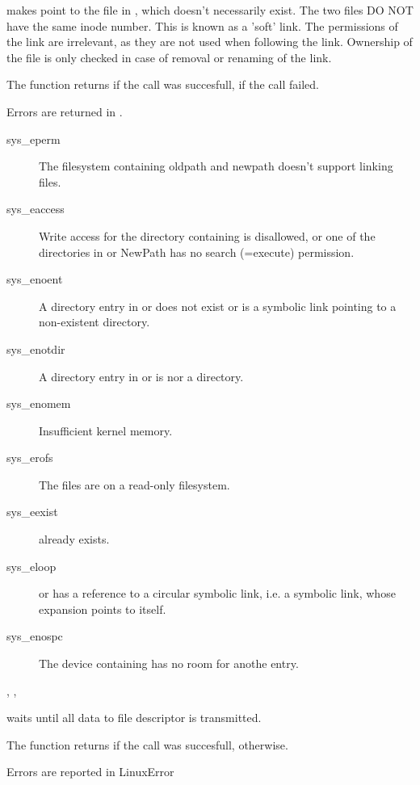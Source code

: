 { makes  point to the file in , which doesn't
necessarily exist. The two files DO NOT have the same inode number.
This is known as a 'soft' link.
The permissions of the link are irrelevant, as they are not used when
following the link. Ownership of the file is only checked in case of removal
or renaming of the link.

The function returns  if the call was succesfull,  if the call
failed.
}
{ Errors are returned in .
\begin{description}
\item[sys\_eperm] The filesystem containing oldpath and newpath doesn't
support linking files.
\item[sys\_eaccess] Write access for the directory containing 
is disallowed, or one of the directories in  or {NewPath} has no
search (=execute) permission.
\item[sys\_enoent] A directory entry in  or  does
not exist or is a symbolic link pointing to a non-existent directory.
\item[sys\_enotdir] A directory entry in  or  is
nor a directory.
\item[sys\_enomem] Insufficient kernel memory.
\item[sys\_erofs] The files are on a read-only filesystem.
\item[sys\_eexist]  already exists.
\item[sys\_eloop]  or  has a reference to a circular
symbolic link, i.e. a symbolic link, whose expansion points to itself.
\item[sys\_enospc] The device containing  has no room for anothe
entry.
\end{description}
}
{, ,  }



{ 
  waits until all data to file descriptor  is transmitted.
  
  The function returns  if the call was succesfull, 
  otherwise.
}
{Errors are reported in LinuxError}
{}

